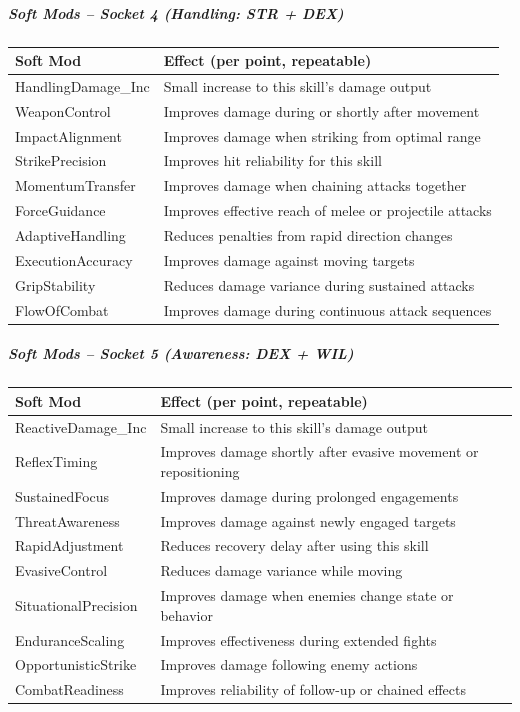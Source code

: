 \subparagraph{Soft Mods -- Socket 4 (Handling: STR + DEX)}
\begin{tabular}{l|p{9.5cm}}
	\textbf{Soft Mod} & \textbf{Effect (per point, repeatable)} \\ \hline
	HandlingDamage\_Inc & Small increase to this skill’s damage output \\
	WeaponControl & Improves damage during or shortly after movement \\
	ImpactAlignment & Improves damage when striking from optimal range \\
	StrikePrecision & Improves hit reliability for this skill \\
	MomentumTransfer & Improves damage when chaining attacks together \\
	ForceGuidance & Improves effective reach of melee or projectile attacks \\
	AdaptiveHandling & Reduces penalties from rapid direction changes \\
	ExecutionAccuracy & Improves damage against moving targets \\
	GripStability & Reduces damage variance during sustained attacks \\
	FlowOfCombat & Improves damage during continuous attack sequences \\
\end{tabular}

\subparagraph{Soft Mods -- Socket 5 (Awareness: DEX + WIL)}
\begin{tabular}{l|p{9.5cm}}
	\textbf{Soft Mod} & \textbf{Effect (per point, repeatable)} \\ \hline
	ReactiveDamage\_Inc & Small increase to this skill’s damage output \\
	ReflexTiming & Improves damage shortly after evasive movement or repositioning \\
	SustainedFocus & Improves damage during prolonged engagements \\
	ThreatAwareness & Improves damage against newly engaged targets \\
	RapidAdjustment & Reduces recovery delay after using this skill \\
	EvasiveControl & Reduces damage variance while moving \\
	SituationalPrecision & Improves damage when enemies change state or behavior \\
	EnduranceScaling & Improves effectiveness during extended fights \\
	OpportunisticStrike & Improves damage following enemy actions \\
	CombatReadiness & Improves reliability of follow-up or chained effects \\
\end{tabular}

